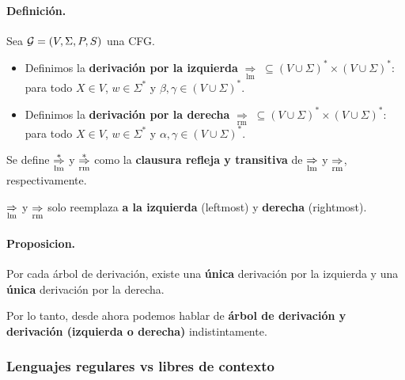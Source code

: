 \paragraph{Definición.} Sea $\mathcal{G} = (V, \Sigma, P, S)$ una CFG.
\begin{itemize}
    \item Definimos la \textbf{derivación por la izquierda} $\underset{\mathrm{lm}}{\Rightarrow} \; \subseteq(V \cup \Sigma)^* \times(V \cup \Sigma)^*$:
          para todo $X \in V$, $w \in \Sigma^*$ y $\beta,\gamma \in (V \cup \Sigma)^*$.

    \item Definimos la \textbf{derivación por la derecha} $\underset{\mathrm{rm}}{\Rightarrow} \; \subseteq(V \cup \Sigma)^* \times(V \cup \Sigma)^*$:
          para todo $X \in V$, $w \in \Sigma^*$ y $\alpha,\gamma \in (V\cup \Sigma)^*$.
\end{itemize}

Se define $\underset{\mathrm{lm}}{\overset{*}{\Rightarrow}}$ y $\underset{\mathrm{rm}}{\overset{*}{\Rightarrow}}$ como la \textbf{clausura refleja y transitiva} de $\underset{\mathrm{lm}}{\overset{}{\Rightarrow}}$ y $\underset{\mathrm{rm}}{\overset{}{\Rightarrow}}$, respectivamente.  \medbreak

$\underset{\mathrm{lm}}{\overset{}{\Rightarrow}}$ y $\underset{\mathrm{rm}}{\overset{}{\Rightarrow}}$ solo reemplaza \textbf{a la izquierda} (leftmost) y \textbf{derecha} (rightmost).


\paragraph{Proposicion.} Por cada árbol de derivación, existe una \textbf{única} derivación por la izquierda y una \textbf{única} derivación por la derecha. \medbreak

Por lo tanto, desde ahora podemos hablar de \textbf{árbol de derivación y derivación (izquierda o derecha)} indistintamente.

\subsubsection{Lenguajes regulares vs libres de contexto}

